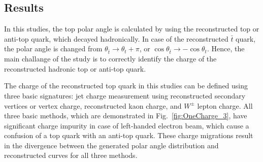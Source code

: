 \subsection{Results}

In this studies, the top polar angle is calculated by using the reconstructed top or anti-top quark, which decayed hadronically.
In case of the reconstructed $\bar{t}$ quark, the polar angle is changed from $\theta_{\bar{t}} \to \theta_{t} + \pi$, or $\cos\theta_{\bar{t}} \to -\cos\theta_{t}$. 
Hence, the main challange of the study is to correctly identify the charge of the reconstructed hadronic top or anti-top quark. 

The charge of the reconstructed top quark in this studies can be defined using three basic signatures: jet charge measurement using reconstructed secondary vertices or vertex charge, reconstructed kaon charge, and $W^\pm$ lepton charge. 
All three basic methods, which are demonstrated in Fig.~\ref{fig:OneCharge_3}, have significant charge impurity in case of left-handed electron beam, which cause a confusion of a top quark with an anti-top quark.
These charge migrations result in the divergence between the generated polar angle distribution and reconstructed curves for all three methods. 


